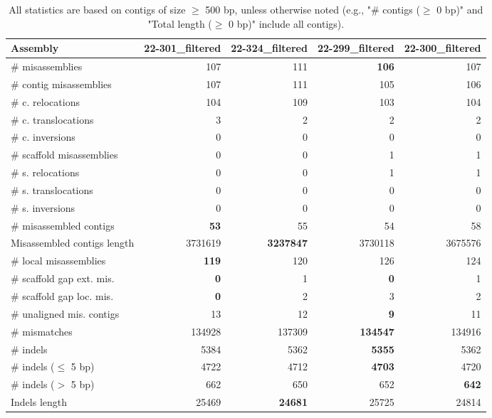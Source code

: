 \documentclass[12pt,a4paper]{article}
\begin{document}
\begin{table}[ht]
\begin{center}
\caption{All statistics are based on contigs of size $\geq$ 500 bp, unless otherwise noted (e.g., "\# contigs ($\geq$ 0 bp)" and "Total length ($\geq$ 0 bp)" include all contigs).}
\begin{tabular}{|l*{4}{|r}|}
\hline
Assembly & 22-301\_filtered & 22-324\_filtered & 22-299\_filtered & 22-300\_filtered \\ \hline
\# misassemblies & 107 & 111 & {\bf 106} & 107 \\ \hline
\hspace{2mm}\# contig misassemblies & 107 & 111 & 105 & 106 \\ \hline
\hspace{5mm}\# c. relocations & 104 & 109 & 103 & 104 \\ \hline
\hspace{5mm}\# c. translocations & 3 & 2 & 2 & 2 \\ \hline
\hspace{5mm}\# c. inversions & 0 & 0 & 0 & 0 \\ \hline
\hspace{2mm}\# scaffold misassemblies & 0 & 0 & 1 & 1 \\ \hline
\hspace{5mm}\# s. relocations & 0 & 0 & 1 & 1 \\ \hline
\hspace{5mm}\# s. translocations & 0 & 0 & 0 & 0 \\ \hline
\hspace{5mm}\# s. inversions & 0 & 0 & 0 & 0 \\ \hline
\# misassembled contigs & {\bf 53} & 55 & 54 & 58 \\ \hline
Misassembled contigs length & 3731619 & {\bf 3237847} & 3730118 & 3675576 \\ \hline
\# local misassemblies & {\bf 119} & 120 & 126 & 124 \\ \hline
\# scaffold gap ext. mis. & {\bf 0} & 1 & {\bf 0} & 1 \\ \hline
\# scaffold gap loc. mis. & {\bf 0} & 2 & 3 & 2 \\ \hline
\# unaligned mis. contigs & 13 & 12 & {\bf 9} & 11 \\ \hline
\# mismatches & 134928 & 137309 & {\bf 134547} & 134916 \\ \hline
\# indels & 5384 & 5362 & {\bf 5355} & 5362 \\ \hline
\hspace{5mm}\# indels ($\leq$ 5 bp) & 4722 & 4712 & {\bf 4703} & 4720 \\ \hline
\hspace{5mm}\# indels ($>$ 5 bp) & 662 & 650 & 652 & {\bf 642} \\ \hline
Indels length & 25469 & {\bf 24681} & 25725 & 24814 \\ \hline
\end{tabular}
\end{center}
\end{table}
\end{document}
